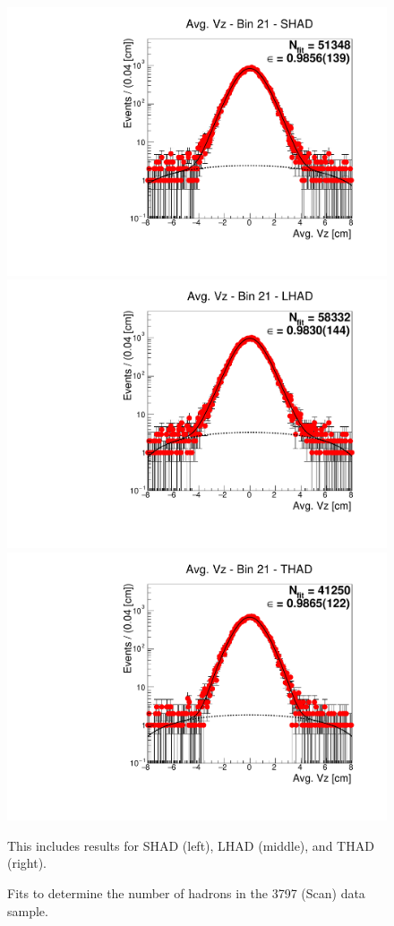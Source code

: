 \begin{figure}[H]
\centering
\includegraphics[scale=0.25]{figures/plots/nonDDbar_fit_results/scan/fit_scan_21_data_SHAD.pdf}
\hspace{-0.5cm}
\includegraphics[scale=0.25]{figures/plots/nonDDbar_fit_results/scan/fit_scan_21_data_LHAD.pdf}
\hspace{-0.5cm}
\includegraphics[scale=0.25]{figures/plots/nonDDbar_fit_results/scan/fit_scan_21_data_THAD.pdf}
\caption{Fits to determine the number of hadrons in the 3797 (Scan) data sample.}
{This includes results for SHAD (left), LHAD (middle), and THAD (right).}
\label{fig:hadron_fits_scan_21}
\end{figure}

